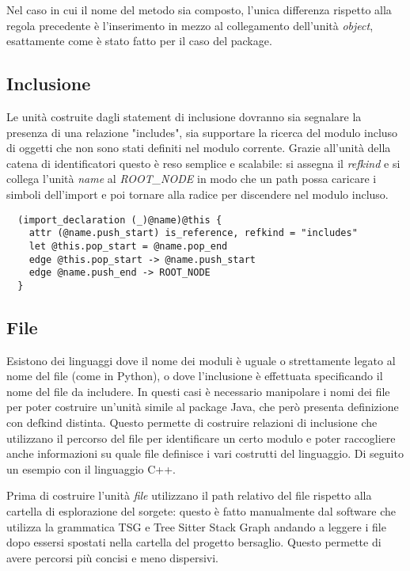Nel caso in cui il nome del metodo sia composto, l'unica differenza rispetto alla regola precedente \`e l'inserimento in mezzo al collegamento dell'unit\`a \emph{object}, esattamente come \`e stato fatto per il caso del package.

\subsection{Inclusione}

Le unit\`a costruite dagli statement di inclusione dovranno sia segnalare la presenza di una relazione "includes", sia supportare la ricerca del modulo incluso di oggetti che non sono stati definiti nel modulo corrente.
Grazie all'unit\`a della catena di identificatori questo \`e reso semplice e scalabile: si assegna il \emph{refkind} e si collega l'unit\`a \emph{name} al \emph{ROOT\_NODE} in modo che un path possa caricare i simboli dell'import e poi tornare alla radice per discendere nel modulo incluso.

\begin{lstlisting}
  (import_declaration (_)@name)@this {
    attr (@name.push_start) is_reference, refkind = "includes"
    let @this.pop_start = @name.pop_end
    edge @this.pop_start -> @name.push_start
    edge @name.push_end -> ROOT_NODE
  }
\end{lstlisting}

\subsection{File}

Esistono dei linguaggi dove il nome dei moduli \`e uguale o strettamente legato al nome del file (come in Python), o dove l'inclusione \`e effettuata specificando il nome del file da includere.
In questi casi \`e necessario manipolare i nomi dei file per poter costruire un'unit\`a simile al package Java, che per\`o presenta definizione con defkind distinta.
Questo permette di costruire relazioni di inclusione che utilizzano il percorso del file per identificare un certo modulo e poter raccogliere anche informazioni su quale file definisce i vari costrutti del linguaggio.
Di seguito un esempio con il linguaggio C++.

Prima di costruire l'unit\`a \emph{file} utilizzano il path relativo del file rispetto alla cartella di esplorazione del sorgete: questo \`e fatto manualmente dal software che utilizza la grammatica TSG e Tree Sitter Stack Graph andando a leggere i file dopo essersi spostati nella cartella del progetto bersaglio. Questo permette di avere percorsi pi\`u concisi e meno dispersivi.

